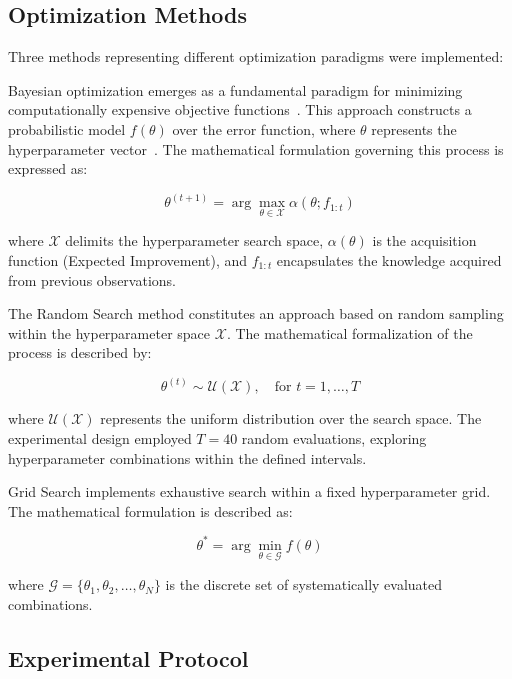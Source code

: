 \documentclass[conference]{IEEEtran}
\begin{document}
\subsection{Optimization Methods}

Three methods representing different optimization paradigms were implemented:

Bayesian optimization emerges as a fundamental paradigm for minimizing computationally expensive objective functions~\cite{mockus1978application}. This approach constructs a probabilistic model $f(\theta)$ over the error function, where $\theta$ represents the hyperparameter vector~\cite{wu2019practical}. The mathematical formulation governing this process is expressed as:

\begin{equation}
\theta^{(t+1)} = \arg\max_{\theta \in \mathcal{X}} \alpha(\theta; f_{1:t})
\end{equation}

where $\mathcal{X}$ delimits the hyperparameter search space, $\alpha(\theta)$ is the acquisition function (Expected Improvement), and $f_{1:t}$ encapsulates the knowledge acquired from previous observations.

The Random Search method constitutes an approach based on random sampling within the hyperparameter space $\mathcal{X}$. The mathematical formalization of the process is described by:

\begin{equation}
\theta^{(t)} \sim \mathcal{U}(\mathcal{X}), \quad \text{for } t = 1, \dots, T
\end{equation}

where $\mathcal{U}(\mathcal{X})$ represents the uniform distribution over the search space. The experimental design employed $T = 40$ random evaluations, exploring hyperparameter combinations within the defined intervals.

Grid Search implements exhaustive search within a fixed hyperparameter grid. The mathematical formulation is described as:

\begin{equation}
\theta^* = \arg\min_{\theta \in \mathcal{G}} f(\theta)
\end{equation}

where $\mathcal{G} = \{\theta_1, \theta_2, \dots, \theta_N\}$ is the discrete set of systematically evaluated combinations.

\subsection{Experimental Protocol}
\end{document}
